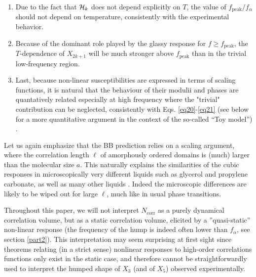\documentclass[single column,pre]{revtex4}
\begin{document}
 \begin{enumerate}
\item Due to the fact that ${\cal H}_k$ does not depend explicitly on $T$, the value of $f_{\text{peak}}/f_{\alpha}$ should not depend on temperature, consistently with the experimental behavior. 
\item Because of the dominant role played by the glassy response for $f \ge f_{\text{peak}}$, the $T$-dependence of $X_{2k+1}$ will be much stronger above $f_{\text{peak}}$ than in the trivial low-frequency region. 
\item Last, because non-linear susceptibilities are expressed in terms of scaling functions, 
it is natural that the behaviour of their modulii and phases are quantatively related especially at high frequency 
where the "trivial" contribution can be neglected, consistently with Eqs. \ref{eq20}-\ref{eq21} (see below for a more quantitative argument in the context of the so-called ``Toy model'') \cite{note9}.  
\end{enumerate}

Let us again emphasize that the BB prediction relies on a scaling argument, where the correlation length $\ell$ of amorphously ordered domains is (much) larger than 
the molecular size $a$. This naturally explains the similarities of the cubic responses in microscopically very different liquids such as glycerol and propylene carbonate, as well as 
many other liquids \cite{Bau13,Cas15}. Indeed the microscopic differences are likely to be wiped out for large $\ell$, much like in usual phase transitions. 

Throughout this paper, we will not interpret $N_{\text{corr}}$ as a purely dynamical correlation volume, but as a static correlation volume, elicited by a ''quasi-static'' non-linear response (the frequency of the hump is indeed often lower than $f_{\alpha}$, see section \ref{part2}). This interpretation may seem surprising at first sight since theorems relating (in a strict sense) nonlinear responses to high-order correlations functions only exist in the static case, and therefore cannot be straightforwardly used to interpret the humped shape of $X_3$ (and of $X_5$) observed experimentally. 
\end{document}
